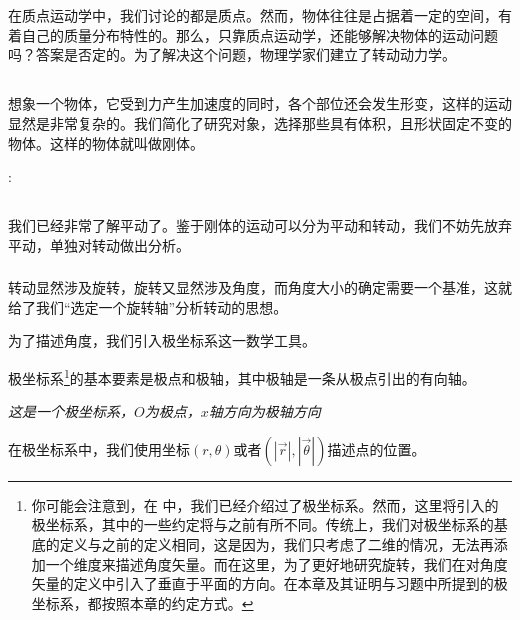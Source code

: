 \chapter[转动动力学]{}
在质点运动学中，我们讨论的都是质点。然而，物体往往是占据着一定的空间，有着自己的质量分布特性的。那么，只靠质点运动学，还能够解决物体的运动问题吗？答案是否定的。为了解决这个问题，物理学家们建立了转动动力学。
\section[刚体]{}
想象一个物体，它受到力产生加速度的同时，各个部位还会发生形变，这样的运动显然是非常复杂的。我们简化了研究对象，选择那些具有体积，且形状固定不变的物体。这样的物体就叫做刚体。
\begin{Itemize}
    \item {}:
\end{Itemize}
\section[转动]{}
我们已经非常了解平动了。鉴于刚体的运动可以分为平动和转动，我们不妨先放弃平动，单独对转动做出分析。

\subsection[极坐标系]{}
转动显然涉及旋转，旋转又显然涉及角度，而角度大小的确定需要一个基准，这就给了我们“选定一个旋转轴”分析转动的思想。

为了描述角度，我们引入极坐标系这一数学工具。

极坐标系\footnote{你可能会注意到，在 中，我们已经介绍过了极坐标系。然而，这里将引入的极坐标系，其中的一些约定将与之前有所不同。传统上，我们对极坐标系的基底的定义与之前的定义相同，这是因为，我们只考虑了二维的情况，无法再添加一个维度来描述角度矢量。而在这里，为了更好地研究旋转，我们在对角度矢量的定义中引入了垂直于平面的方向。在本章及其证明与习题中所提到的极坐标系，都按照本章的约定方式。}的基本要素是极点和极轴，其中极轴是一条从极点引出的有向轴。
\begin{center}
    \em 这是一个极坐标系，$O$为极点，$x$轴方向为极轴方向
\end{center}
在极坐标系中，我们使用坐标$(r,\theta)$或者$(|\vec{r}|,|\vec{\theta}|)$描述点的位置。

